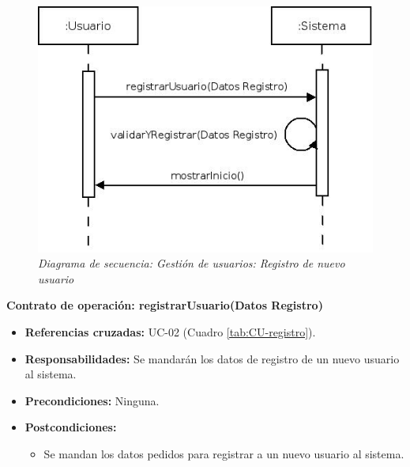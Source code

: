 \vspace{10mm}

\begin{figure}[H]
\centering
  \includegraphics[scale=.55]{img/secuencias/gestion-usuarios-registro.jpeg}
  \caption{\textit{Diagrama de secuencia: Gestión de usuarios: Registro de nuevo usuario}}
  \label{fig:secuencia-gestion-usuarios-registro}
\end{figure}


\textbf{Contrato de operación: registrarUsuario(Datos Registro)}
\begin{itemize}
\item \textbf{Referencias cruzadas:} UC-02 (Cuadro \ref{tab:CU-registro}).
\item \textbf{Responsabilidades:} Se mandarán los datos de registro de un nuevo usuario al sistema.
\item \textbf{Precondiciones:} Ninguna.
\item \textbf{Postcondiciones:} 
 \begin{itemize}
\item Se mandan los datos pedidos para registrar a un nuevo usuario al sistema.
\end {itemize}
\end {itemize}


